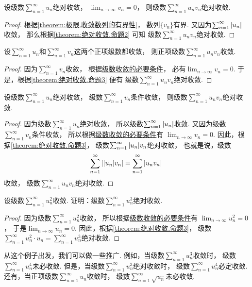 \begin{proposition}\label{theorem:绝对收敛.命题3}
设级数\(\sum_{n=1}^\infty u_n\)绝对收敛，
\(\lim_{n\to\infty} v_n = 0\)，
则级数\(\sum_{n=1}^\infty u_n v_n\)绝对收敛.
\begin{proof}
根据\cref{theorem:极限.收敛数列的有界性}，
数列\(\{v_n\}\)有界.
又因为\(\sum_{n=1}^\infty \abs{u_n}\)收敛，
那么根据\cref{theorem:绝对收敛.命题2} 可知
级数\(\sum_{n=1}^\infty u_n v_n\)绝对收敛.
\end{proof}
\end{proposition}

\begin{proposition}\label{theorem:绝对收敛.命题4}
设\(\sum_{n=1}^\infty u_n\)和\(\sum_{n=1}^\infty v_n\)这两个正项级数都收敛，
则正项级数\(\sum_{n=1}^\infty u_n v_n\)收敛.
\begin{proof}
因为\(\sum_{n=1}^\infty v_n\)收敛，
根据\hyperref[theorem:无穷级数.级数收敛的必要条件]{级数收敛的必要条件}，
必有\(\lim_{n\to\infty} v_n = 0\).
于是，根据\cref{theorem:绝对收敛.命题3} 便有
级数\(\sum_{n=1}^\infty u_n v_n\)绝对收敛.
\end{proof}
\end{proposition}

\begin{proposition}\label{theorem:绝对收敛.命题5}
设级数\(\sum_{n=1}^\infty u_n\)绝对收敛，
级数\(\sum_{n=1}^\infty v_n\)条件收敛，
则级数\(\sum_{n=1}^\infty u_n v_n\)绝对收敛.
\begin{proof}
因为级数\(\sum_{n=1}^\infty u_n\)绝对收敛，
所以级数\(\sum_{n=1}^\infty \abs{u_n}\)收敛.
又因为级数\(\sum_{n=1}^\infty v_n\)条件收敛，
所以根据\hyperref[theorem:无穷级数.级数收敛的必要条件]{级数收敛的必要条件}有
\(\lim_{n\to\infty} v_n = 0\).
因此，根据\cref{theorem:绝对收敛.命题3}，
级数\(\sum_{n=1}^\infty \abs{u_n} v_n\)绝对收敛，
也就是说，级数\[
	\sum_{n=1}^\infty \abs{\abs{u_n} v_n}
	= \sum_{n=1}^\infty \abs{u_n v_n}
\]收敛，
级数\(\sum_{n=1}^\infty u_n v_n\)绝对收敛.
\end{proof}
\end{proposition}

\begin{example}
设级数\(\sum_{n=1}^\infty u_n^2\)收敛.
证明：级数\(\sum_{n=1}^\infty u_n^3\)绝对收敛.
\begin{proof}
因为级数\(\sum_{n=1}^\infty u_n^2\)收敛，
所以根据\hyperref[theorem:无穷级数.级数收敛的必要条件]{级数收敛的必要条件}有
\(\lim_{n\to\infty} u_n^2 = 0\)，
于是\(\lim_{n\to\infty} u_n = 0\).
因此，根据\cref{theorem:绝对收敛.命题3}，
级数\(\sum_{n=1}^\infty u_n^2 \cdot u_n
= \sum_{n=1}^\infty u_n^3\)绝对收敛.
\end{proof}
\end{example}
从这个例子出发，我们可以做一些推广.
例如，当级数\(\sum_{n=1}^\infty u_n^3\)收敛时，
级数\(\sum_{n=1}^\infty u_n^4\)未必收敛.
但是，当级数\(\sum_{n=1}^\infty u_n^3\)绝对收敛时，
级数\(\sum_{n=1}^\infty u_n^4\)必定收敛.
还有，当正项级数\(\sum_{n=1}^\infty u_n\)收敛时，
级数\(\sum_{n=1}^\infty \sqrt{u_n}\)未必收敛.

